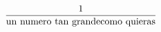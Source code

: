 \documentclass[preview]{standalone}
\begin{document}
\begin{align*}
\frac{1}{\mathrm{un\ numero\ tan\ grande} \hfill \break \mathrm{como\ quieras}}
\end{align*}
\end{document}
